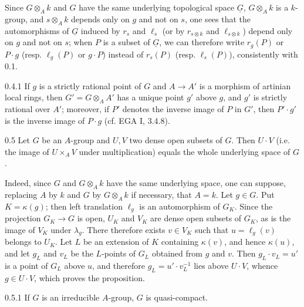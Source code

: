 Since $G\otimes_Ak$ and $G$ have the same underlying topological space $\underline G$, $G\otimes_Ak$ is a $k$-group, and $s\otimes_Ak$ depends only on $g$ and not on $s$, one sees that the automorphisms of $\underline G$ induced by $r_s$ and $\ell_s$ (or by $r_{s\otimes k}$ and $\ell_{s\otimes k}$) depend only on $g$ and not on $s$; when $P$ is a subset of $\underline G$, we can therefore write $r_g(P)$ or $P\cdot g$ (resp. $\ell_g(P)$ or $g\cdot P$) instead of $r_s(P)$ (resp. $\ell_s(P)$), consistently with 0.1.
\begin{remark}{0.4.1}\label{VIA.0.4.1}
If $g$ is a strictly rational point of $G$ and $A\to A'$ is a morphism of artinian local rings, then $G'=G\otimes_AA'$ has a unique point $g'$ above $g$, and $g'$ is strictly rational over $A'$; moreover, if $P'$ denotes the inverse image of $P$ in $G'$, then $P'\cdot g'$ is the inverse image of $P\cdot g$ (cf. EGA I, 3.4.8).
\end{remark}
\begin{proposition}{0.5}\label{VIA.0.5}
Let $G$ be an $A$-group and $U,V$ two dense open subsets of $G$. Then $U\cdot V$ (i.e. the image of $U\times_AV$ under multiplication) equals the whole underlying space of $G$.
\end{proposition}
Indeed, since $G$ and $G\otimes_Ak$ have the same underlying space, one can suppose, replacing $A$ by $k$ and $G$ by $G\otimes_Ak$ if necessary, that $A=k$. Let $g\in G$. Put $K=\kappa(g)$; then left translation $\ell_g$ is an automorphism of $G_K$. Since the projection $G_K\to G$ is open, $U_K$ and $V_K$ are dense open subsets of $G_K$, as is the image of $V_K$ under $\lambda_g$. There therefore exists $v\in V_K$ such that $u=\ell_g(v)$ belongs to $U_K$. Let $L$ be an extension of $K$ containing $\kappa(v)$, and hence $\kappa(u)$, and let $g_L$ and $v_L$ be the $L$-points of $G_L$ obtained from $g$ and $v$. Then $g_L\cdot v_L=u'$ is a point of $G_L$ above $u$, and therefore $g_L=u'\cdot v_L^{-1}$ lies above $U\cdot V$, whence $g\in U\cdot V$, which proves the proposition.
\begin{corollary}{0.5.1}\label{VIA.0.5.1}
If $G$ is an irreducible $A$-group, $G$ is quasi-compact.
\end{corollary}
